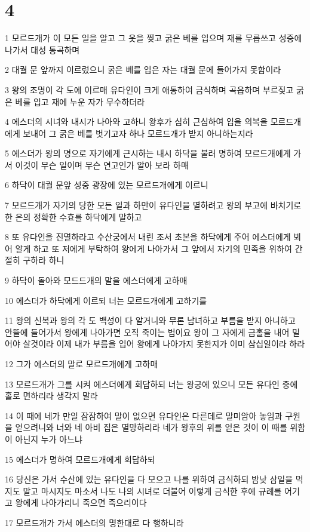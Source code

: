 \chapter{4}

\par 1 모르드개가 이 모든 일을 알고 그 옷을 찢고 굵은 베를 입으며 재를 무릅쓰고 성중에 나가서 대성 통곡하며
\par 2 대궐 문 앞까지 이르렀으니 굵은 베를 입은 자는 대궐 문에 들어가지 못함이라
\par 3 왕의 조명이 각 도에 이르매 유다인이 크게 애통하여 금식하며 곡읍하며 부르짖고 굵은 베를 입고 재에 누운 자가 무수하더라
\par 4 에스더의 시녀와 내시가 나아와 고하니 왕후가 심히 근심하여 입을 의복을 모르드개에게 보내어 그 굵은 베를 벗기고자 하나 모르드개가 받지 아니하는지라
\par 5 에스더가 왕의 명으로 자기에게 근시하는 내시 하닥을 불러 명하여 모르드개에게 가서 이것이 무슨 일이며 무슨 연고인가 알아 보라 하매
\par 6 하닥이 대궐 문앞 성중 광장에 있는 모르드개에게 이르니
\par 7 모르드개가 자기의 당한 모든 일과 하만이 유다인을 멸하려고 왕의 부고에 바치기로 한 은의 정확한 수효를 하닥에게 말하고
\par 8 또 유다인을 진멸하라고 수산궁에서 내린 조서 초본을 하닥에게 주어 에스더에게 뵈어 알게 하고 또 저에게 부탁하여 왕에게 나아가서 그 앞에서 자기의 민족을 위하여 간절히 구하라 하니
\par 9 하닥이 돌아와 모드드개의 말을 에스더에게 고하매
\par 10 에스더가 하닥에게 이르되 너는 모르드개에게 고하기를
\par 11 왕의 신복과 왕의 각 도 백성이 다 알거니와 무론 남녀하고 부름을 받지 아니하고 안뜰에 들어가서 왕에게 나아가면 오직 죽이는 법이요 왕이 그 자에게 금홀을 내어 밀어야 살것이라 이제 내가 부름을 입어 왕에게 나아가지 못한지가 이미 삼십일이라 하라
\par 12 그가 에스더의 말로 모르드개에게 고하매
\par 13 모르드개가 그를 시켜 에스더에게 회답하되 너는 왕궁에 있으니 모든 유다인 중에 홀로 면하리라 생각지 말라
\par 14 이 때에 네가 만일 잠잠하여 말이 없으면 유다인은 다른데로 말미암아 놓임과 구원을 얻으려니와 너와 네 아비 집은 멸망하리라 네가 왕후의 위를 얻은 것이 이 때를 위함이 아닌지 누가 아느냐
\par 15 에스더가 명하여 모르드개에게 회답하되
\par 16 당신은 가서 수산에 있는 유다인을 다 모으고 나를 위하여 금식하되 밤낮 삼일을 먹지도 말고 마시지도 마소서 나도 나의 시녀로 더불어 이렇게 금식한 후에 규례를 어기고 왕에게 나아가리니 죽으면 죽으리이다
\par 17 모르드개가 가서 에스더의 명한대로 다 행하니라

